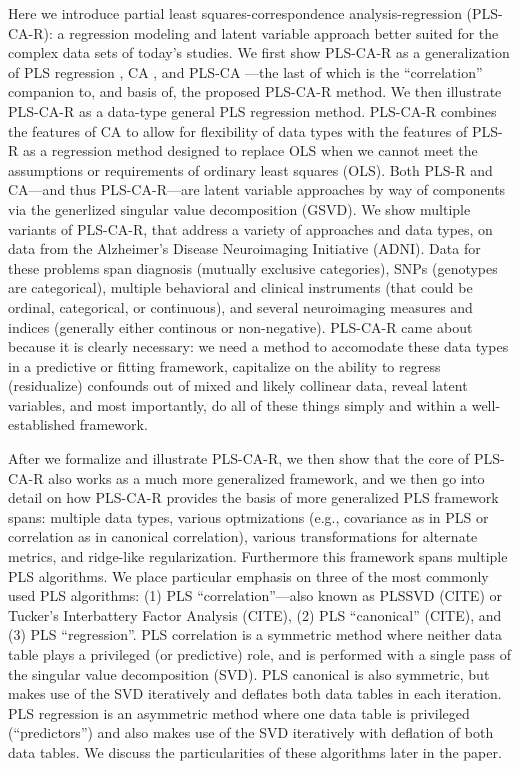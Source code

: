 \documentclass[12pt]{article}
\begin{document}
Here we introduce partial least squares-correspondence
analysis-regression (PLS-CA-R): a regression modeling and latent
variable approach better suited for the complex data sets of today's
studies. We first show PLS-CA-R as a generalization of PLS regression
\citep{wold_soft_1975, wold_collinearity_1984, tenenhaus_regression_1998, abdi_partial_2010-1},
CA
\citep{greenacre_theory_1984, greenacre_correspondence_2010-1, lebart_multivariate_1984},
and PLS-CA \citep{beaton_partial_2016}---the last of which is the
``correlation'' companion to, and basis of, the proposed PLS-CA-R
method. We then illustrate PLS-CA-R as a data-type general PLS
regression method. PLS-CA-R combines the features of CA to allow for
flexibility of data types with the features of PLS-R as a regression
method designed to replace OLS when we cannot meet the assumptions or
requirements of ordinary least squares (OLS). Both PLS-R and CA---and
thus PLS-CA-R---are latent variable approaches by way of components via
the generlized singular value decomposition (GSVD). We show multiple
variants of PLS-CA-R, that address a variety of approaches and data
types, on data from the Alzheimer's Disease Neuroimaging Initiative
(ADNI). Data for these problems span diagnosis (mutually exclusive
categories), SNPs (genotypes are categorical), multiple behavioral and
clinical instruments (that could be ordinal, categorical, or
continuous), and several neuroimaging measures and indices (generally
either continous or non-negative). PLS-CA-R came about because it is
clearly necessary: we need a method to accomodate these data types in a
predictive or fitting framework, capitalize on the ability to regress
(residualize) confounds out of mixed and likely collinear data, reveal
latent variables, and most importantly, do all of these things simply
and within a well-established framework.

After we formalize and illustrate PLS-CA-R, we then show that the core
of PLS-CA-R also works as a much more generalized framework, and we then
go into detail on how PLS-CA-R provides the basis of more generalized
PLS framework spans: multiple data types, various optmizations (e.g.,
covariance as in PLS or correlation as in canonical correlation),
various transformations for alternate metrics, and ridge-like
regularization. Furthermore this framework spans multiple PLS
algorithms. We place particular emphasis on three of the most commonly
used PLS algorithms: (1) PLS ``correlation''---also known as PLSSVD
(CITE) or Tucker's Interbattery Factor Analysis (CITE), (2) PLS
``canonical'' (CITE), and (3) PLS ``regression''. PLS correlation is a
symmetric method where neither data table plays a privileged (or
predictive) role, and is performed with a single pass of the singular
value decomposition (SVD). PLS canonical is also symmetric, but makes
use of the SVD iteratively and deflates both data tables in each
iteration. PLS regression is an asymmetric method where one data table
is privileged (``predictors'') and also makes use of the SVD iteratively
with deflation of both data tables. We discuss the particularities of
these algorithms later in the paper.
\end{document}
